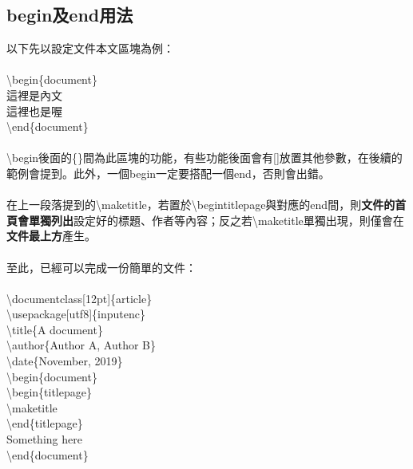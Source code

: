 \documentclass[12pt]{article}
\begin{document}
\begin{CJK*}{UTF8}{bsmi}
		\newpage
		
		\subsection{begin及end用法}
			以下先以設定文件本文區塊為例：\\ \\
			\textbackslash begin\{document\} \\
			這裡是內文\\
			這裡也是喔\\
			\textbackslash end\{document\} \\ \\
			\hspace*{25pt}\textbackslash begin後面的\{\}間為此區塊的功能，有些功能後面會有[]放置其他參數，在後續的範例會提到。此外，一個begin一定要搭配一個end，否則會出錯。 \\ \\
			\hspace*{25pt}在上一段落提到的\textbackslash maketitle，若置於\textbackslash begin{titlepage}與對應的end間，則\textbf{文件的首頁會單獨列出}設定好的標題、作者等內容；反之若\textbackslash maketitle單獨出現，則僅會在\textbf{文件最上方}產生。 \\ \\
			至此，已經可以完成一份簡單的文件： \\ \\
				\textbackslash documentclass[12pt]\{article\} \\
				\textbackslash usepackage[utf8]\{inputenc\} \\
				\textbackslash title\{A document\} \\
				\textbackslash author\{Author A, Author B\} \\
				\textbackslash date\{November, 2019\} \\
				\textbackslash begin\{document\} \\
				\hspace*{25pt}\textbackslash begin\{titlepage\} \\
				\hspace*{50pt}\textbackslash maketitle \\
				\hspace*{25pt}\textbackslash end\{titlepage\} \\
				\hspace*{25pt}Something here \\
				\textbackslash end\{document\} 
				

\end{CJK*}
\end{document}

